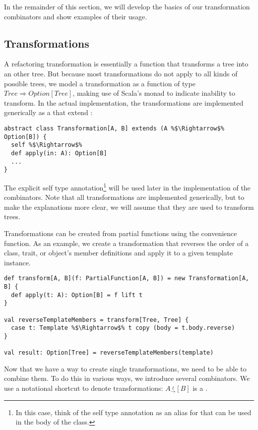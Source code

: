\documentclass[10pt,a4paper,oneside]{scrreprt}
\begin{document}
In the remainder of this section, we will develop the basics of our transformation combinators and show examples of their usage.

\subsection{Transformations}

A refactoring transformation is essentially a function that transforms a tree into an other tree. But because most transformations do not apply to all kinds of possible trees, we model a transformation as a function of type $Tree\Rightarrow Option[Tree]$, making use of Scala's  monad to indicate inability to transform. In the actual implementation, the transformations are implemented generically as a  that extend :

\begin{lstlisting}
abstract class Transformation[A, B] extends (A %$\Rightarrow$% Option[B]) {
  self %$\Rightarrow$%
  def apply(in: A): Option[B]
  ...
}
\end{lstlisting}

The explicit self type annotation\footnote{In this case, think of the self type annotation as an alias for  that can be used in the body of the class.} will be used later in the implementation of the combinators. Note that all transformations are implemented generically, but to make the explanations more clear, we will assume that they are used to transform trees.

Transformations can be created from partial functions using the  convenience function. As an example, we create a transformation that reverses the order of a class, trait, or object's member definitions and apply it to a given template instance.

\begin{lstlisting}
def transform[A, B](f: PartialFunction[A, B]) = new Transformation[A, B] {
  def apply(t: A): Option[B] = f lift t
}

val reverseTemplateMembers = transform[Tree, Tree] {
  case t: Template %$\Rightarrow$% t copy (body = t.body.reverse)
}

val result: Option[Tree] = reverseTemplateMembers(template)
\end{lstlisting}

Now that we have a way to create single transformations, we need to be able to combine them. To do this in various ways, we introduce several combinators. We use a notational shortcut to denote transformations: $A \overset{t}{_\rightarrow} [B]$ is a .
\end{document}
